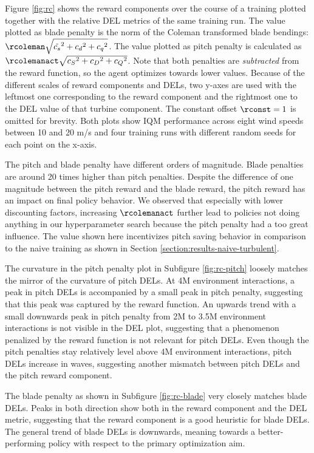 Figure \ref{fig:rc} shows the reward components over the course of a training plotted together with the relative DEL metrics of the same training run. The value plotted as blade penalty is the norm of the Coleman transformed blade bendings: $\rcoleman \sqrt{\tilde{c_s}^2 + {c_d}^2 + {c_q}^2}$. The value plotted as pitch penalty is calculated as $\rcolemanact \sqrt{{c_S}^2 + {c_D}^2 + {c_Q}^2}$. Note that both penalties are \textit{subtracted} from the reward function, so the agent optimizes towards lower values. Because of the different scales of reward components and DELs, two y-axes are used with the leftmost one corresponding to the reward component and the rightmost one to the DEL value of that turbine component. The constant offset $\rconst=1$ is omitted for brevity. Both plots show \ac{IQM} performance across eight wind speeds between 10 and 20 m/s and four training runs with different random seeds for each point on the x-axis. 

The pitch and blade penalty have different orders of magnitude. Blade penalties are around 20 times higher than pitch penalties. Despite the difference of one magnitude between the pitch reward and the blade reward, the pitch reward has an impact on final policy behavior. We observed that especially with lower discounting factors, increasing $\rcolemanact$ further lead to policies not doing anything in our hyperparameter search because the pitch penalty had a too great influence. The value shown here incentivizes pitch saving behavior in comparison to the naive training as shown in Section \ref{section:results-naive-turbulent}.

The curvature in the pitch penalty plot in Subfigure \ref{fig:rc-pitch} loosely matches the mirror of the curvature of pitch DELs. At 4M environment interactions, a peak in pitch DELs is accompanied by a small peak in pitch penalty, suggesting that this peak was captured by the reward function. An upwards trend with a small downwards peak in pitch penalty from 2M to 3.5M environment interactions is not visible in the DEL plot, suggesting that a phenomenon penalized by the reward function is not relevant for pitch DELs. Even though the pitch penalties stay relatively level above 4M environment interactions, pitch DELs increase in waves, suggesting another mismatch between pitch DELs and the pitch reward component.

The blade penalty as shown in Subfigure \ref{fig:rc-blade} very closely matches blade DELs. Peaks in both direction show both in the reward component and the DEL metric, suggesting that the reward component is a good heuristic for blade DELs. The general trend of blade DELs is downwards, meaning towards a better-performing policy with respect to the primary optimization aim.

